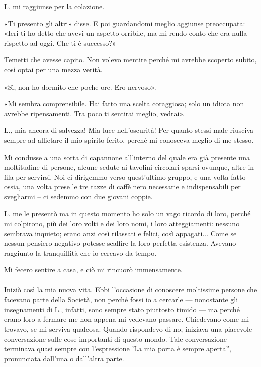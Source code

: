 \documentclass[a4paper,12pt]{book}
\begin{document}
L. mi raggiunse per la colazione.

«Ti presento gli altri» disse. E poi guardandomi meglio aggiunse preoccupata:
«Ieri ti ho detto che avevi un aspetto orribile, ma mi rendo conto che era nulla
rispetto ad oggi. Che ti è successo?»

Temetti che avesse capito. Non volevo mentire perché mi avrebbe scoperto
subito, così optai per una mezza verità.

«Sì, non ho dormito che poche ore. Ero nervoso».

«Mi sembra comprensibile. Hai fatto una scelta coraggiosa; solo un idiota non
avrebbe ripensamenti. Tra poco ti sentirai meglio, vedrai».

L., mia ancora di salvezza! Mia luce nell'oscurità! Per quanto stessi male
riusciva sempre ad allietare il mio spirito ferito, perché mi conosceva meglio
di me stesso.

Mi condusse a una sorta di capannone all'interno del quale era già presente una
moltitudine di persone, alcune sedute ai tavolini circolari sparsi ovunque, altre
in fila per servirsi. Noi ci dirigemmo verso quest'ultimo gruppo, e una volta
fatto -- ossia, una volta prese le tre tazze di caffè nero necessarie e
indispensabili per svegliarmi -- ci sedemmo con due giovani coppie.

L. me le presentò ma in questo momento ho solo un vago ricordo di loro, perché
mi colpirono, più dei loro volti e dei loro nomi, i loro atteggiamenti: nessuno
sembrava inquieto; erano anzi così rilassati e felici, così appagati... Come se
nessun pensiero negativo potesse scalfire la loro perfetta esistenza. Avevano
raggiunto la tranquillità che io cercavo da tempo.

Mi fecero sentire a casa, e ciò mi rincuorò immensamente.

\paragraph{}
Iniziò così la mia nuova vita. Ebbi l'occasione di conoscere moltissime persone
che facevano parte della Società, non perché fossi io a cercarle --- nonostante
gli insegnamenti di L., infatti, sono sempre stato piuttosto timido --- ma
perché erano loro a fermare me non appena mi vedevano passare. Chiedevano come mi
trovavo, se mi serviva qualcosa. Quando rispondevo di no, iniziava una piacevole
conversazione sulle cose importanti di questo mondo. Tale conversazione terminava
quasi sempre con l'espressione 'La mia porta è sempre aperta'', pronunciata dall'una
o dall'altra parte.
\end{document}
